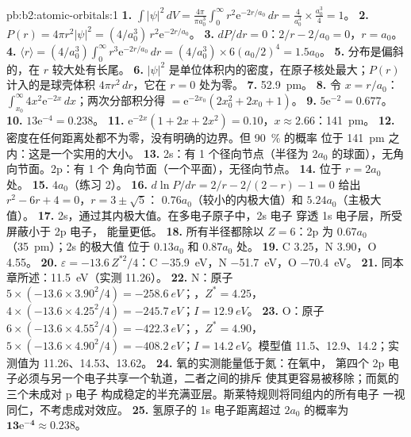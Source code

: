 \begin{solution}{pb:b2:atomic-orbitals:1}
\textbf{1.} $\int|\psi|^2\,dV = \frac{4\pi}{\pi a_0^3}\int_0^\infty r^2\mathrm e^{-2r/a_0}\,dr =
\frac{4}{a_0^3} \times \frac{a_0^3}{4} = 1$。
\textbf{2.} $P(r) = 4\pi r^2|\psi|^2 = (4/a_0^3)\,r^2\mathrm e^{-2r/a_0}$。
\textbf{3.} $dP/dr = 0$：$2/r - 2/a_0 = 0$，$r = a_0$。
\textbf{4.} $\langle r\rangle = (4/a_0^3)\int_0^\infty r^3\mathrm e^{-2r/a_0}\,dr = (4/a_0^3)
\times 6(a_0/2)^4 = 1.5a_0$。
\textbf{5.} 分布是偏斜的，在 $r$ 较大处有长尾。
\textbf{6.} $|\psi|^2$ 是单位体积内的密度，在原子核处最大；$P(r)$
计入的是球壳体积 $4\pi r^2\,dr$，它在 $r = 0$ 处为零。
\textbf{7.} \qty{52.9}{pm}。
\textbf{8.} 令 $x = r/a_0$：$\int_{x_0}^\infty 4x^2\mathrm e^{-2x}\,dx$；两次分部积分得
$= \mathrm e^{-2x_0}(2x_0^2 + 2x_0 + 1)$。
\textbf{9.} $5\mathrm e^{-2} = 0.677$。
\textbf{10.} $13\mathrm e^{-4} = 0.238$。
\textbf{11.} $\mathrm e^{-2x}(1 + 2x + 2x^2) = 0.10$，$x \approx 2.66$：\qty{141}{pm}。
\textbf{12.} 密度在任何距离处都不为零，没有明确的边界。但 90~\% 的概率
位于 \qty{141}{pm} 之内：这是一个实用的大小。
\textbf{13.} 2s：有 1 个径向节点（半径为 $2a_0$ 的球面），无角向节面。2p：有 1 个
角向节面（一个平面），无径向节点。
\textbf{14.} 位于 $r = 2a_0$ 处。
\textbf{15.} $4a_0$（练习 2）。
\textbf{16.} $d\ln P/dr = 2/r - 2/(2 - r) - 1 = 0$ 给出 $r^2 - 6r + 4 = 0$，$r = 3 \pm \sqrt5$：
$0.76a_0$（较小的内极大值）和 $5.24a_0$（主极大值）。
\textbf{17.} 2s，通过其内极大值。在多电子原子中，2s 电子
穿透 1s 电子层，所受屏蔽小于 2p 电子，
能量更低。
\textbf{18.} 所有半径都除以 $Z = 6$：2p 为 $0.67a_0$（\qty{35}{pm}）；2s 的极大值
位于 $0.13a_0$ 和 $0.87a_0$ 处。
\textbf{19.} C 3.25，N 3.90，O 4.55。
\textbf{20.} $\varepsilon = -13.6\,Z^{*2}/4$：C \qty{-35.9}{eV}，N \qty{-51.7}{eV}，O
\qty{-70.4}{eV}。
\textbf{21.} 同本章所述：\qty{11.5}{eV}（实测 11.26）。
\textbf{22.} N：原子 $5 \times (-13.6 \times 3.90^2/4) = \qty{-258.6}{eV}$；，$Z^* =
4.25$，$4 \times (-13.6 \times 4.25^2/4) = \qty{-245.7}{eV}$；$I = \qty{12.9}{eV}$。
\textbf{23.} O：原子 $6 \times (-13.6 \times 4.55^2/4) = \qty{-422.3}{eV}$；，$Z^* =
4.90$，$5 \times (-13.6 \times 4.90^2/4) = \qty{-408.2}{eV}$；$I = \qty{14.2}{eV}$。模型值
11.5、12.9、14.2；实测值为 11.26、14.53、13.62。
\textbf{24.} 氧的实测能量低于氮：在氧中，
第四个 2p 电子必须与另一个电子共享一个轨道，二者之间的排斥
使其更容易被移除；而氮的三个未成对 p 电子
构成稳定的半充满亚层。斯莱特规则将同组内的所有电子
一视同仁，不考虑成对效应。
\textbf{25.} 氢原子的 1s 电子距离超过 $2a_0$ 的概率为
$\boldsymbol{13\mathrm e^{-4} \approx 0.238}$。
\end{solution}
